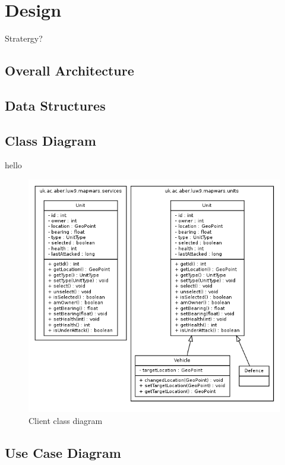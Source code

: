 \chapter{Design}
Stratergy?


\section{Overall Architecture}


\section{Data Structures}

\section{Class Diagram}
hello
\begin{figure}[H]
  \centering
   \includegraphics[width=1\textwidth]{Images/diagrams/client-class.png}
  \caption{Client class diagram}
  \label{fig:client}
\end{figure}

\section{Use Case Diagram}





